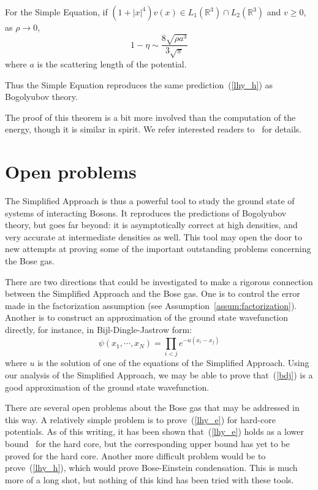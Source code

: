 \documentclass{ian}
\begin{document}
  For the Simple Equation, if $(1+|x|^4)v(x)\in L_1(\mathbb R^3)\cap L_2(\mathbb R^3)$ and $v\geqslant 0$, as $\rho\to0$,
  \begin{equation}
    1-\eta\sim\frac{8\sqrt{\rho a^3}}{3\sqrt\pi}
  \end{equation}
  where $a$ is the scattering length of the potential.
\endtheo
\bigskip

Thus the Simple Equation reproduces the same prediction\-~(\ref{lhy_h}) as Bogolyubov theory.
\bigskip

\indent
The proof of this theorem is a bit more involved than the computation of the energy, though it is similar in spirit.
We refer interested readers to\-~\cite{CJL21} for details.

\section{Open problems}\label{sec:open}
\indent
The Simplified Approach is thus a powerful tool to study the ground state of systems of interacting Bosons.
It reproduces the predictions of Bogolyubov theory, but goes far beyond: it is asymptotically correct at high densities, and very accurate at intermediate densities as well.
This tool may open the door to new attempts at proving some of the important outstanding problems concerning the Bose gas.
\bigskip

\indent
There are two directions that could be investigated to make a rigorous connection between the Simplified Approach and the Bose gas.
One is to control the error made in the factorization assumption (see Assumption\-~\ref{assum:factorization}).
Another is to construct an approximation of the ground state wavefunction directly, for instance, in Bijl-Dingle-Jastrow form:
\begin{equation}
  \psi(x_1,\cdots,x_N)=\prod_{i<j}e^{-u(x_i-x_j)}
  \label{bdj}
\end{equation}
where $u$ is the solution of one of the equations of the Simplified Approach.
Using our analysis of the Simplified Approach, we may be able to prove that\-~(\ref{bdj}) is a good approximation of the ground state wavefunction.
\bigskip

\indent
There are several open problems about the Bose gas that may be addressed in this way.
A relatively simple problem is to prove\-~(\ref{lhy_e}) for hard-core potentials.
As of this writing, it has been shown that\-~(\ref{lhy_e}) holds as a lower bound\-~\cite{FS23} for the hard core, but the corresponding upper bound has yet to be proved for the hard core.
Another more difficult problem would be to prove\-~(\ref{lhy_h}), which would prove Bose-Einstein condensation.
This is much more of a long shot, but nothing of this kind has been tried with these tools.
\bigskip
\end{document}
